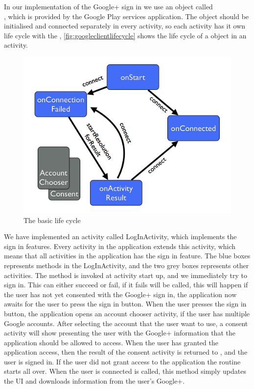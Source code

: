 In our implementation of the Google+ sign in we use an object called \\\citep{googleapiclient-docs}, which is provided by the Google Play services application. 
The object  should be initialised and connected separately in every activity, so each activity has it own life cycle with the , \autoref{fig:googleclientlifecycle} shows the life cycle of a  object in an activity.
\begin{figure}[H]
\centering
\includegraphics[width=0.75\linewidth]{img/googleclientflow.png}
\caption{The  basic life cycle\cite{googleapiclient-lifecycle}}
\label{fig:googleclientlifecycle}
\end{figure}
We have implemented an activity called LogInActivity, which implements the sign in features. Every activity in the application extends this activity, which means that all activities in the application has the sign in feature. 
The blue boxes represents methods in the LogInActivity, and the two grey boxes represents other activities. The method  is invoked at activity start up, and we immediately try to sign in. 
This can either succeed or fail, if it fails  will be called, this will happen if the user has not yet consented with the Google+ sign in, the application now awaits for the user to press the sign in button. 
When the user presses the sign in button, the application opens an account chooser activity, if the user has multiple Google accounts. 
After selecting the account that the user want to use, a consent activity will show presenting the user with the Google+ information that the application should be allowed to access. 
When the user has granted the application access, then the result of the consent activity is returned to , and the user is signed in. 
If the user did not grant access to the application the routine starts all over. When the user is connected  is called, this method simply updates the UI and downloads information from the user's Google+. 

